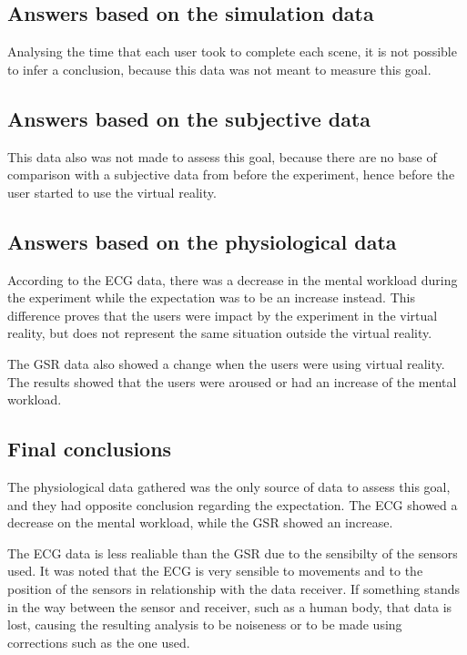 \subsection{Answers based on the simulation data}

Analysing the time that each user took to complete each scene, it is not possible to infer a conclusion, because this data was not meant to measure this goal.

\subsection{Answers based on the subjective data}

This data also was not made to assess this goal, because there are no base of comparison with a subjective data from before the experiment, hence before the user started to use the virtual reality.

\subsection{Answers based on the physiological data}

According to the ECG data, there was a decrease in the mental workload during the experiment while the expectation was to be an increase instead. This difference proves that the users were impact by the experiment in the virtual reality, but does not represent the same situation outside the virtual reality.

The GSR data also showed a change when the users were using virtual reality. The results showed that the users were aroused or had an increase of the mental workload.

\subsection{Final conclusions}

The physiological data gathered was the only source of data to assess this goal, and they had opposite conclusion regarding the expectation. The ECG showed a decrease on the mental workload, while the GSR showed an increase.

The ECG data is less realiable than the GSR due to the sensibilty of the sensors used. It was noted that the ECG is very sensible to movements and to the position of the sensors in relationship with the data receiver. If something stands in the way between the sensor and receiver, such as a human body, that data is lost, causing the resulting analysis to be noiseness or to be made using corrections such as the one used.

